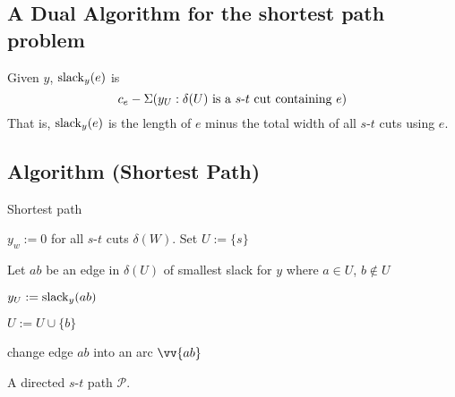 \subsection{A Dual Algorithm for the shortest path problem}
Given $ y $, $\operatorname{slack}_{y} (e)$ is
\[ c_e-\Sigma(y_U :\delta(U) \text{ is a $s$-$t$ cut containing $ e $}) \]
That is, $ \operatorname{slack}_y(e) $ is the length of $ e $ minus the total width of all
$s$-$t$ cuts using $ e $.


\begin{algbox}
    \subsection{Algorithm (Shortest Path)}
    \begin{algorithm}[H]
        \caption{Shortest path}
        $ y_w := 0 $ for all $s$-$t$ cuts $ \delta(W) $. Set $ U:=\{s\} $
    
         {
            Let $ ab $ be an edge in $ \delta(U) $ of smallest slack for $ y $
            where $ a\in U $, $ b\notin U $
    
            $ y_U:=\operatorname{slack}_y(ab) $
    
            $ U:=U\cup \{b\} $
    
            change edge $ ab $ into an arc $ \vv{ab} $
        }
    
        \Return A directed $s$-$t$ path $ \mathcal{P} $.
    \end{algorithm}
\end{algbox}